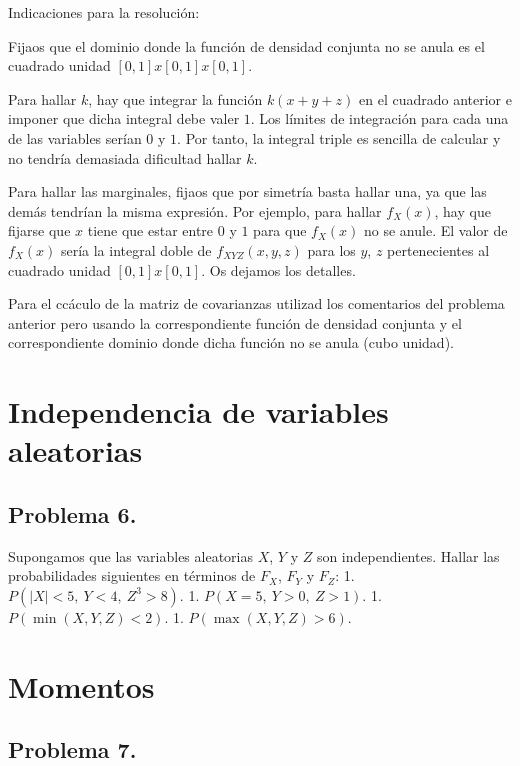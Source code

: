 \documentclass[
]{article}
\begin{document}
Indicaciones para la resolución:

Fijaos que el dominio donde la función de densidad conjunta no se anula
es el cuadrado unidad \([0,1]x[0,1]x[0,1]\).

Para hallar \(k\), hay que integrar la función \(k(x+y+z)\) en el
cuadrado anterior e imponer que dicha integral debe valer \(1\). Los
límites de integración para cada una de las variables serían \(0\) y
\(1\). Por tanto, la integral triple es sencilla de calcular y no
tendría demasiada dificultad hallar \(k\).

Para hallar las marginales, fijaos que por simetría basta hallar una, ya
que las demás tendrían la misma expresión. Por ejemplo, para hallar
\(f_X(x)\), hay que fijarse que \(x\) tiene que estar entre \(0\) y
\(1\) para que \(f_X(x)\) no se anule. El valor de \(f_X(x)\) sería la
integral doble de \(f_{XYZ}(x,y,z)\) para los \(y\), \(z\)
pertenecientes al cuadrado unidad \([0,1]x[0,1]\). Os dejamos los
detalles.

Para el ccáculo de la matriz de covarianzas utilizad los comentarios del
problema anterior pero usando la correspondiente función de densidad
conjunta y el correspondiente dominio donde dicha función no se anula
(cubo unidad).

\hypertarget{independencia-de-variables-aleatorias}{%
\section{Independencia de variables
aleatorias}\label{independencia-de-variables-aleatorias}}

\hypertarget{problema-6.}{%
\subsection{Problema 6.}\label{problema-6.}}

Supongamos que las variables aleatorias \(X\), \(Y\) y \(Z\) son
independientes. Hallar las probabilidades siguientes en términos de
\(F_X\), \(F_Y\) y \(F_Z\): 1. \(P(|X|<5,\ Y<4,\ Z^3>8)\). 1.
\(P(X=5,\ Y>0,\ Z>1)\). 1. \(P(\min(X,Y,Z)<2)\). 1.
\(P(\max(X, Y, Z)>6)\).

\hypertarget{momentos}{%
\section{Momentos}\label{momentos}}

\hypertarget{problema-7.}{%
\subsection{Problema 7.}\label{problema-7.}}
\end{document}
